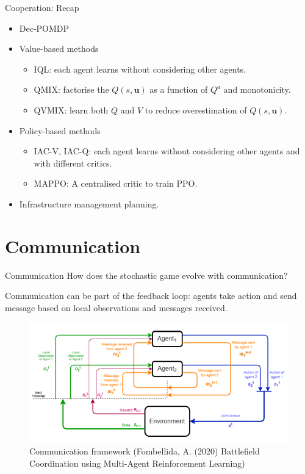 \documentclass[9pt, hyperref={pdfusetitle,colorlinks=true,allcolors=DarkBlue}]{beamer}
\begin{document}
\begin{frame}{Cooperation: Recap}
\begin{itemize}
    \item Dec-POMDP
    \vfill
    \item Value-based methods
        \begin{itemize}
        \item IQL: each agent learns without considering other agents.
        \item QMIX: factorise the $Q(s,\bm{u})$ as a function of $Q^a$ and monotonicity.
        \item QVMIX: learn both $Q$ and $V$ to reduce overestimation of $Q(s,\bm{u})$.
        \end{itemize}{}
    \vfill
    \item Policy-based methods
        \begin{itemize}
        \item IAC-V, IAC-Q: each agent learns without considering other agents and with different critics.
        \item MAPPO: A centralised critic to train PPO.
        \end{itemize}{}
    \vfill
    \item Infrastructure management planning.
\end{itemize}{}
\end{frame}

\section{Communication}
\begin{frame}{Communication}
How does the stochastic game evolve with communication?

Communication can be part of the feedback loop: agents take action and send message based on local observations and messages received. 

\begin{figure}
    \centering
    \includegraphics[scale=0.45]{com_scheme_1.png}
    \caption{Communication framework (Fombellida, A. (2020) Battlefield Coordination using Multi-Agent Reinforcement Learning)}
\end{figure}
\end{frame}
\end{document}
